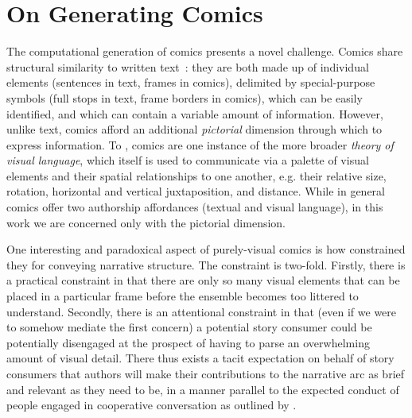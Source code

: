 \section{On Generating Comics}

The computational generation of comics presents a novel challenge. Comics 
share structural similarity to written text~\cite{saraceni2016relatedness}: 
they are both made up of individual elements (sentences in text, frames in 
comics), delimited by special-purpose symbols (full stops in text, frame 
borders in comics), which can be easily identified, and which can contain a 
variable amount of information. However, unlike text, comics afford an additional \emph{pictorial} dimension through which to express information. To 
, comics are one instance of the more broader 
\emph{theory of visual language}, which itself is used to communicate via
a palette of visual elements and their spatial relationships to one another,
e.g. their relative size, rotation, horizontal and vertical juxtaposition, 
and distance. While in general comics offer two authorship affordances 
(textual and visual language), in this work we are concerned only with 
the pictorial dimension.

One interesting and paradoxical aspect of purely-visual comics is how
constrained they for conveying narrative structure. The constraint is 
two-fold. Firstly, there is a practical constraint in that there are 
only so many visual elements that can be placed in a particular frame
before the ensemble becomes too littered to understand. Secondly, there
is an attentional constraint in that (even if we were to somehow mediate
the first concern) a potential story consumer could be potentially
disengaged at the prospect of having to parse an overwhelming amount of
visual detail. There thus exists a tacit expectation on behalf of story
consumers that authors will make their contributions to the narrative arc
as brief and relevant as they need to be, in a manner parallel to the
expected conduct of people engaged in cooperative conversation as outlined 
by . 

